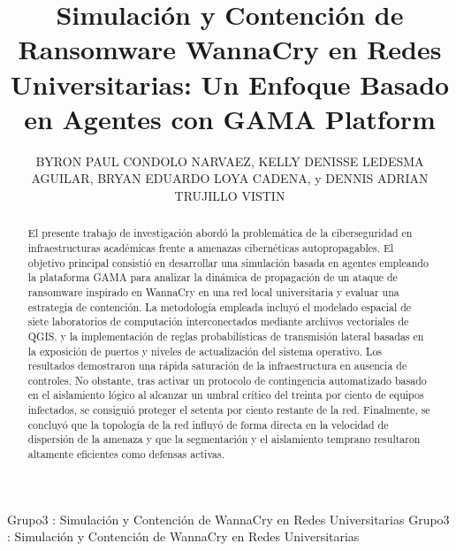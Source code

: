 \documentclass{ieeeaccess}
\begin{document}

\title{Simulación y Contención de Ransomware WannaCry en Redes Universitarias: Un Enfoque Basado en Agentes con GAMA Platform}

\author{\uppercase{Byron Paul Condolo Narvaez}, 
\uppercase{Kelly Denisse Ledesma Aguilar}, 
\uppercase{Bryan Eduardo Loya Cadena}, y 
\uppercase{Dennis Adrian Trujillo Vistin}}

\address[1]{Facultad de Ingeniería y Ciencias Aplicadas, Universidad Central del Ecuador, Quito 170521, Ecuador (e-mail: bpcondolo@uce.edu.ec, kdledesma@uce.edu.ec, beloya@uce.edu.ec, datrujillo@uce.edu.ec)}


\markboth
{Grupo3 \headeretal: Simulación y Contención de WannaCry en Redes Universitarias}
{Grupo3 \headeretal: Simulación y Contención de WannaCry en Redes Universitarias}


\begin{abstract}
El presente trabajo de investigación abordó la problemática de la ciberseguridad en infraestructuras académicas frente a amenazas cibernéticas autopropagables. El objetivo principal consistió en desarrollar una simulación basada en agentes empleando la plataforma GAMA para analizar la dinámica de propagación de un ataque de ransomware inspirado en WannaCry en una red local universitaria y evaluar una estrategia de contención. La metodología empleada incluyó el modelado espacial de siete laboratorios de computación interconectados mediante archivos vectoriales de QGIS, y la implementación de reglas probabilísticas de transmisión lateral basadas en la exposición de puertos y niveles de actualización del sistema operativo. Los resultados demostraron una rápida saturación de la infraestructura en ausencia de controles. No obstante, tras activar un protocolo de contingencia automatizado basado en el aislamiento lógico al alcanzar un umbral crítico del treinta por ciento de equipos infectados, se consiguió proteger el setenta por ciento restante de la red. Finalmente, se concluyó que la topología de la red influyó de forma directa en la velocidad de dispersión de la amenaza y que la segmentación y el aislamiento temprano resultaron altamente eficientes como defensas activas.
\end{abstract}
\end{document}
